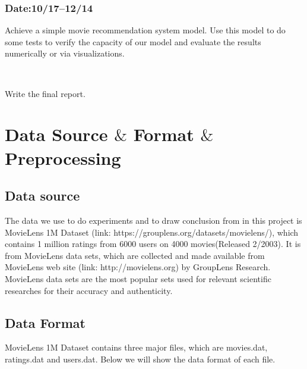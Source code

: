 \documentclass[two column]{article}
\begin{document}
\subsubsection{Date:10/17--12/14}
\par Achieve a simple movie recommendation system model. Use this model to do some tests to verify the capacity of our model and evaluate the results numerically or via visualizations.
\par ~

\par Write the final report.


\section{Data Source $\&$ Format $\&$ Preprocessing}
\subsection{Data source}
\par The data we use to do experiments and to draw conclusion from in this project is MovieLens 1M Dataset (link: https://grouplens.org/datasets/movielens/), which contains 1 million ratings from 6000 users on 4000 movies(Released 2/2003). It is from MovieLens data sets, which are collected and made available from MovieLens web site (link: http://movielens.org) by GroupLens Research. MovieLens data sets are the most popular sets used for relevant scientific researches for their accuracy and authenticity.

\subsection{Data Format}
\par MovieLens 1M Dataset contains three major files, which are movies.dat, ratings.dat and users.dat. Below we will show the data format of each file.
\end{document}
